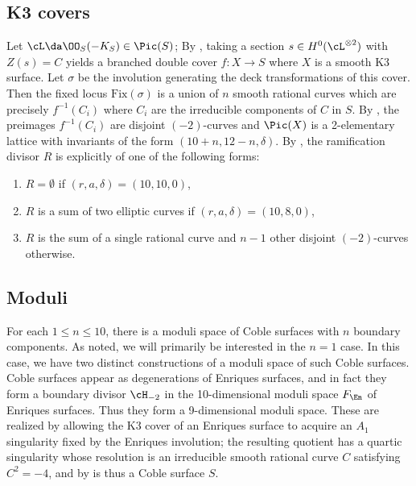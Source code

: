 \documentclass[../main.tex]{subfiles}
\begin{document}
\subsection{K3 covers}

\begin{remark}[On relation to K3s]
Let $\cL \da \OO_S(-K_S) \in \Pic(S)$; By \cite[Prop. 9.1.1]{DK24}, taking a section $s\in H^0(\cL ^{\otimes 2})$ with $Z(s) = C$ yields a branched double cover $f: X\to S$ where $X$ is a smooth K3 surface. Let $\sigma$ be the involution generating the deck transformations of this cover. Then the fixed locus $\mathrm{Fix}(\sigma)$ is a union of $n$ smooth rational curves which are precisely $f^{-1}(C_i)$ where $C_i$ are the irreducible components of $C$ in $S$. By \cite[Def. 5.4.3]{CD12}, the preimages $f^{-1}(C_i)$ are disjoint $(-2)$-curves and $\Pic(X)$ is a 2-elementary lattice with invariants of the form $(10+n, 12-n, \delta)$. By \cite[Def. 5.4.3, Eqn. 5.3.1]{CD12}, the ramification divisor $R$ is explicitly of one of the following forms:

\begin{enumerate}
    \item $R=\emptyset$ if $(r,a,\delta) = (10, 10, 0)$,
    \item $R$ is a sum of two elliptic curves if $(r,a,\delta) = (10, 8, 0)$,
    \item $R$ is the sum of a single rational curve and $n-1$ other disjoint $(-2)$-curves otherwise.
\end{enumerate}
\end{remark}

\subsection{Moduli}

\begin{remark}
For each $1\leq n \leq 10$, there is a moduli space of Coble surfaces with $n$ boundary components. As noted, we will primarily be interested in the $n=1$ case. In this case, we have two distinct constructions of a moduli space of such Coble surfaces. Coble surfaces appear as degenerations of Enriques surfaces, and in fact they form a boundary divisor $\cH_{-2}$ in the 10-dimensional moduli space $F_{\En}$ of Enriques surfaces. Thus they form a 9-dimensional moduli space.  These are realized by allowing the K3 cover of an Enriques surface to acquire an $A_1$ singularity fixed by the Enriques involution; the resulting quotient has a quartic singularity whose resolution is an irreducible smooth rational curve $C$ satisfying $C^2 = -4$, and by \cite[p.\, 8]{Nue15} is thus a Coble surface $S$. 
\end{remark}
\end{document}
